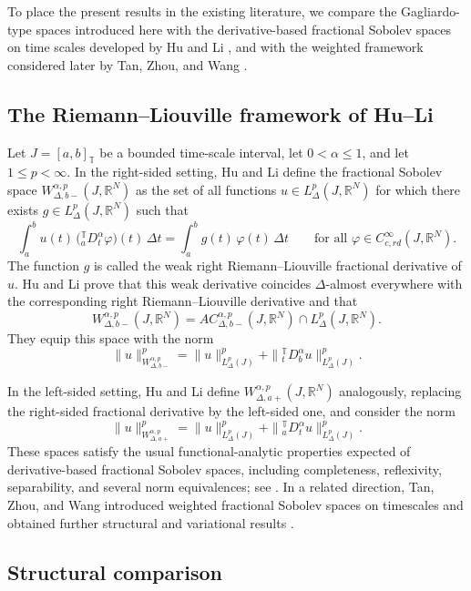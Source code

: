\documentclass[11pt,a4paper]{article}
\numberwithin{equation}{section}
\theoremstyle{definition}
\newcommand{\T}{\mathbb{T}}
\begin{document}
To place the present results in the existing literature, we compare the Gagliardo-type spaces introduced here with the derivative-based fractional Sobolev spaces on time scales developed by Hu and Li \cite{HuLi2022Right,HuLi2022Left}, and with the weighted framework considered later by Tan, Zhou, and Wang \cite{TanZhouWang2025}.

\subsection{The Riemann--Liouville framework of Hu--Li}

Let $J=[a,b]_{\T}$ be a bounded time-scale interval, let $0<\alpha\le 1$, and let $1\le p<\infty$. In the right-sided setting, Hu and Li define the fractional Sobolev space $W^{\alpha,p}_{\Delta,b-}(J,\mathbb R^N)$ as the set of all functions $u\in L^p_\Delta(J,\mathbb R^N)$ for which there exists $g\in L^p_\Delta(J,\mathbb R^N)$ such that
\[
\int_a^b u(t)\,\bigl({}^{\T}_{a}D_t^\alpha \varphi\bigr)(t)\,\Delta t
=
\int_a^b g(t)\,\varphi(t)\,\Delta t
\qquad
\text{for all }\varphi\in C^\infty_{c,rd}(J,\mathbb R^N).
\]
The function $g$ is called the weak right Riemann--Liouville fractional derivative of $u$. Hu and Li prove that this weak derivative coincides $\Delta$-almost everywhere with the corresponding right Riemann--Liouville derivative and that
\[
W^{\alpha,p}_{\Delta,b-}(J,\mathbb R^N)
=
AC^{\alpha,p}_{\Delta,b-}(J,\mathbb R^N)\cap L^p_\Delta(J,\mathbb R^N).
\]
They equip this space with the norm
\[
\|u\|_{W^{\alpha,p}_{\Delta,b-}}^p
=
\|u\|_{L^p_\Delta(J)}^p
+
\|{}^{\T}_{t}D_b^\alpha u\|_{L^p_\Delta(J)}^p.
\]

In the left-sided setting, Hu and Li define $W^{\alpha,p}_{\Delta,a+}(J,\mathbb R^N)$ analogously, replacing the right-sided fractional derivative by the left-sided one, and consider the norm
\[
\|u\|_{W^{\alpha,p}_{\Delta,a+}}^p
=
\|u\|_{L^p_\Delta(J)}^p
+
\|{}^{\T}_{a}D_t^\alpha u\|_{L^p_\Delta(J)}^p.
\]
These spaces satisfy the usual functional-analytic properties expected of derivative-based fractional Sobolev spaces, including completeness, reflexivity, separability, and several norm equivalences; see \cite{HuLi2022Right,HuLi2022Left}. In a related direction, Tan, Zhou, and Wang introduced weighted fractional Sobolev spaces on timescales and obtained further structural and variational results \cite{TanZhouWang2025}.

\subsection{Structural comparison}
\end{document}
